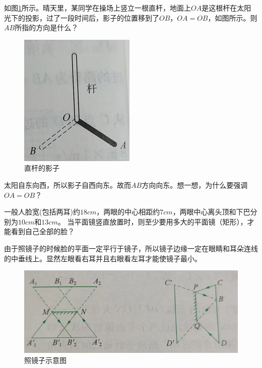 \documentclass[windows,csize4]{BHCexam}
\begin{document}
\begin{groups}
    \begin{questions}[]

        \question[5] 如图\ref{fig:fig_3_7}所示。晴天里，某同学在操场上竖立一根直杆，地面上$OA$是这根杆在太阳光下的投影，过了一段时间后，影子的位置移到了$OB$，$OA=OB$，如图所示。则$AB$所指的方向是什么？
        \begin{figure}[htb]
            \centering
            \includegraphics [scale=0.75,trim=0 0 0 0]{./image/fig_3_7.PNG}
            \caption{直杆的影子}
            \label{fig:fig_3_7}
        \end{figure}
        \begin{solution}{0.5cm}
            \methodonly 太阳自东向西，所以影子自西向东。故而$AB$方向向东。想一想，为什么要强调$OA=OB$？
        \end{solution}
        \vspace{3cm}

        \question[5] 一般人脸宽(包括两耳)约$18cm$，两眼的中心相距约$7cm$，两眼中心离头顶和下巴分别为$10cm$和$13cm$。
        当平面镜竖直放置时，则至少要用多大的平面镜（矩形），才能看到自己全部的脸？
        \begin{solution}{0.5cm}
            \methodonly 由于照镜子的时候脸的平面一定平行于镜子，所以镜子边缘一定在眼睛和耳朵连线的中垂线上。显然左眼看右耳并且右眼看左耳才能使镜子最小。
            \begin{figure}[htb]
                \centering
                \includegraphics [scale=0.5,trim=0 0 0 0]{./image/fig_3_15.PNG}
                \caption{照镜子示意图}
                \label{fig:fig_3_15}
            \end{figure}
        \end{solution}
        \vspace{3cm}


\end{questions}
\end{groups}
\end{document}
